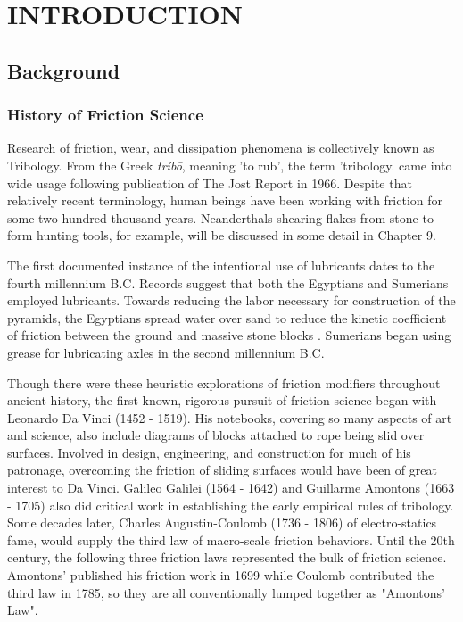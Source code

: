 \chapter{INTRODUCTION}
\label{chap-one}

\section{Background}

\subsection{History of Friction Science}
Research of friction, wear, and dissipation phenomena is collectively known as Tribology. From the Greek \textit{tr\'ib\={o}}, meaning 'to rub', the term 'tribology. came into wide usage following publication of The Jost Report in 1966\cite{101}. Despite that relatively recent terminology, human beings have been working with friction for some two-hundred-thousand years. Neanderthals shearing flakes from stone to form hunting tools, for example, will be discussed in some detail in Chapter 9. 

The first documented instance of the intentional use of lubricants dates to the fourth millennium B.C. Records suggest that both the Egyptians and Sumerians employed lubricants. Towards reducing the labor necessary for construction of the pyramids, the Egyptians spread water over sand to reduce the kinetic coefficient of friction between the ground and massive stone blocks \cite{104}. Sumerians began using grease for lubricating axles in the second millennium B.C.

Though there were these heuristic explorations of friction modifiers throughout ancient history, the first known, rigorous pursuit of friction science began with Leonardo Da Vinci (1452 - 1519). His notebooks, covering so many aspects of art and science, also include diagrams of blocks attached to rope being slid over surfaces. Involved in design, engineering, and construction for much of his patronage, overcoming the friction of sliding surfaces would have been of great interest to Da Vinci. Galileo Galilei (1564 - 1642) and Guillarme Amontons (1663 - 1705) also did critical work in establishing the early empirical rules of tribology. Some decades later, Charles Augustin-Coulomb (1736 - 1806) of electro-statics fame, would supply the third law of macro-scale friction behaviors. Until the 20th century, the following three friction laws represented the bulk of friction science. Amontons' published his friction work in 1699 while Coulomb contributed the third law in 1785, so they are all conventionally lumped together as "Amontons' Law".

